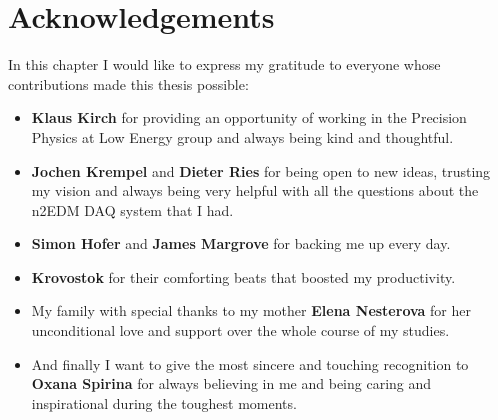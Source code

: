 \chapter{Acknowledgements}

In this chapter I would like to express my gratitude to everyone whose contributions made this thesis possible:

\begin{itemize}
	\item \textbf{Klaus Kirch} for providing an opportunity of working in the Precision Physics at Low Energy group and always being kind and thoughtful.
	\item \textbf{Jochen Krempel} and \textbf{Dieter Ries} for being open to new ideas, trusting my vision and always being very helpful with all the questions about the n2EDM DAQ system that I had.
	\item \textbf{Simon Hofer} and \textbf{James Margrove} for backing me up every day.
	\item \textbf{Krovostok} for their comforting beats that boosted my productivity.
	\item My family with special thanks to my mother \textbf{Elena Nesterova} for her unconditional love and support over the whole course of my studies.
	\item And finally I want to give the most sincere and touching recognition to \textbf{Oxana Spirina} for always believing in me and being caring and inspirational during the toughest moments.
\end{itemize}